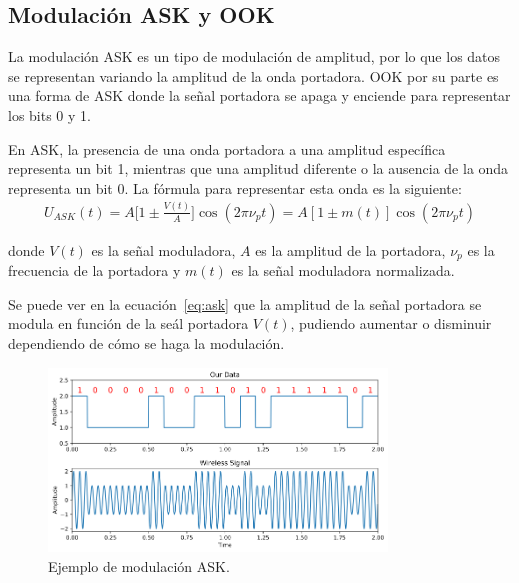 \documentclass[12pt, letterpaper]{article}
\begin{document}
\subsection{Modulación ASK y OOK}
La modulación ASK es un tipo de modulación de amplitud, por lo que los datos se representan variando la amplitud de la onda portadora. OOK por su parte es una forma de ASK donde la señal portadora se apaga y enciende para representar los bits 0 y 1. 

En ASK, la presencia de una onda portadora a una amplitud específica representa un bit 1, mientras que una amplitud diferente o la ausencia de la onda representa un bit 0. La fórmula para representar esta onda es la siguiente:
\begin{align}
    U_{ASK}(t) = A \Big[1 \pm \frac{V(t)}{A} \Big] \cos(2\pi \nu_p t) = 
    A [1 \pm m(t)] \cos(2\pi \nu_p t) \label{eq:ask}
\end{align}

donde $V(t)$ es la señal moduladora, $A$ es la amplitud de la portadora, $\nu_p$ es la frecuencia de la portadora y $m(t)$ es la señal moduladora normalizada.

Se puede ver en la ecuación~\ref{eq:ask} que la amplitud de la señal portadora se modula en función de la seál portadora $V(t)$, pudiendo aumentar o disminuir dependiendo de cómo se haga la modulación.

\begin{figure}[h]
    \centering
    \includegraphics[width=9cm]{images/ASK.png}
    \caption{Ejemplo de modulación ASK.}\label{fig:ask}
\end{figure}
\end{document}
